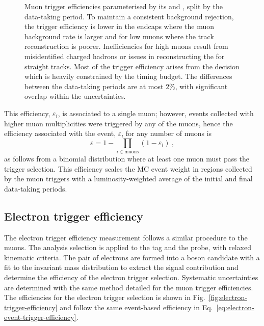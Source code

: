 \begin{figure}[htb]
\begin{subfigure}[b]{0.49\textwidth}
    \end{subfigure}
    \caption[Muon trigger efficiency measurements.]{
        Muon trigger efficiencies parameterised by its \pt and \aeta, split by the data-taking period. To maintain a consistent background rejection, the trigger efficiency is lower in the endcaps where the muon background rate is larger and for low \pt muons where the track reconstruction is poorer. Inefficiencies for high \pt muons result from misidentified charged hadrons or issues in reconstructing the \pt for straight tracks. Most of the trigger efficiency arises from the \HWT decision which is heavily constrained by the timing budget. The differences between the data-taking periods are at most $2\%$, with significant overlap within the uncertainties.
    }
    \label{fig:muon-trigger-efficiency}
\end{figure}

This efficiency, $\varepsilon_i$, is associated to a single muon; however, events collected with higher muon multiplicities were triggered by any of the muons, hence the efficiency associated with the event, $\varepsilon$, for any number of muons is
%
\begin{equation}\label{eq:electron-event-trigger-efficiency}
    \varepsilon = 1 - \prod_{i\in\mathrm{muons}} ( 1 - \varepsilon_i )\ ,
\end{equation}
%
as follows from a binomial distribution where at least one muon must pass the trigger selection. This efficiency scales the MC event weight in regions collected by the muon triggers with a luminosity-weighted average of the initial and final data-taking periods.


\subsection{Electron trigger efficiency}

The electron trigger efficiency measurement \cite{CMS-DP-2017-004} follows a similar procedure to the muons. The analysis selection is applied to the tag and the probe, with relaxed kinematic criteria. The pair of electrons are formed into a \PZ boson candidate with a fit to the invariant mass distribution to extract the signal contribution and determine the efficiency of the electron trigger selection. Systematic uncertainties are determined with the same method detailed for the muon trigger efficiencies. The efficiencies for the electron trigger selection is shown in Fig.~\ref{fig:electron-trigger-efficiency} and follow the same event-based efficiency in Eq.~\ref{eq:electron-event-trigger-efficiency}.

